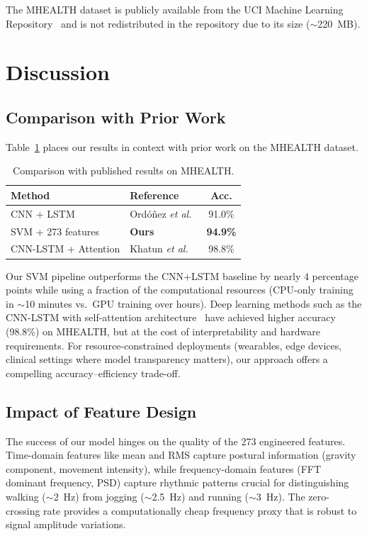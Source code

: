 \documentclass[10pt,twocolumn,letterpaper]{article}
\begin{document}
The MHEALTH dataset is publicly available from the UCI Machine Learning Repository~\cite{banos2014mhealthdroid} and is not redistributed in the repository due to its size ($\sim$220~MB).

\section{Discussion}

\subsection{Comparison with Prior Work}
Table~\ref{tab:comparison} places our results in context with prior work on the MHEALTH dataset.

\begin{table}[H]
\centering
\caption{Comparison with published results on MHEALTH.}
\label{tab:comparison}
\small
\begin{tabular}{llc}
\toprule
\textbf{Method} & \textbf{Reference} & \textbf{Acc.} \\
\midrule
CNN + LSTM           & Ord{\'o}{\~n}ez \textit{et al.}~\cite{ordonez2016deep} & 91.0\% \\
SVM + 273 features   & \textbf{Ours}                                          & \textbf{94.9\%} \\
CNN-LSTM + Attention & Khatun \textit{et al.}~\cite{khatun2022deep}           & 98.8\% \\
\bottomrule
\end{tabular}
\end{table}

Our SVM pipeline outperforms the CNN+LSTM baseline by nearly 4 percentage points while using a fraction of the computational resources (CPU-only training in $\sim$10 minutes vs.\ GPU training over hours). Deep learning methods such as the CNN-LSTM with self-attention architecture~\cite{khatun2022deep} have achieved higher accuracy (98.8\%) on MHEALTH, but at the cost of interpretability and hardware requirements. For resource-constrained deployments (wearables, edge devices, clinical settings where model transparency matters), our approach offers a compelling accuracy--efficiency trade-off.

\subsection{Impact of Feature Design}
The success of our model hinges on the quality of the 273 engineered features. Time-domain features like mean and RMS capture postural information (gravity component, movement intensity), while frequency-domain features (FFT dominant frequency, PSD) capture rhythmic patterns crucial for distinguishing walking ($\sim$2~Hz) from jogging ($\sim$2.5~Hz) and running ($\sim$3~Hz). The zero-crossing rate provides a computationally cheap frequency proxy that is robust to signal amplitude variations.
\end{document}
